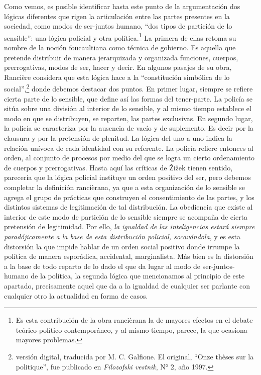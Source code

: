 Como vemos, es posible identificar hasta este punto de la argumentación dos lógicas diferentes que rigen la articulación entre las partes presentes en la sociedad, como modos de ser-juntos humano, \enquote{dos tipos de partición de lo sensible}: una lógica policial y otra política.\footnote{Es esta contribución de la obra rancièrana la de mayores efectos en el debate teórico-político contemporáneo, y al mismo tiempo, parece, la que ocasiona mayores problemas.} La primera de ellas retoma su nombre de la noción foucaultiana como técnica de gobierno. Es aquella que pretende distribuir de manera jerarquizada y organizada funciones, cuerpos, prerrogativas, modos de ser, hacer y decir. En algunos pasajes de su obra, Rancière considera que esta lógica hace a la \enquote{constitución simbólica de lo social},\footnote{\cite[][5]{@7080-RANCIERE1997} versión digital, traducida por M. C. Galfione. El original, \enquote{Onze thèses sur la politique}, fue publicado en \emph{Filozofski vestnik}, N° 2, año 1997.} donde debemos destacar dos puntos. En primer lugar, siempre se refiere cierta parte de lo sensible, que define así las formas del tener-parte. La policía se sitúa sobre una división al interior de lo sensible, y al mismo tiempo establece el modo en que se distribuyen, se reparten, las partes exclusivas. En segundo lugar, la policía se caracteriza por la ausencia de vacío y de suplemento. Es decir por la clausura y por la pretensión de plenitud. La lógica del uno a uno indica la relación unívoca de cada identidad con su referente. La policía refiere entonces al orden, al conjunto de procesos por medio del que se logra un cierto ordenamiento de cuerpos y prerrogativas. Hasta aquí las críticas de Žižek tienen sentido, parecería que la lógica policial instituye un orden positivo del ser, pero debemos completar la definición rancièrana, ya que a esta organización de lo sensible se agrega el grupo de prácticas que construyen el consentimiento de las partes, y los distintos sistemas de legitimación de tal distribución. La obediencia que existe al interior de este modo de partición de lo sensible siempre se acompaña de cierta pretensión de legitimidad. Por ello, \emph{la igualdad de las inteligencias estará siempre paradójicamente a la base de esta distribución policial, socavándola}, y es esta distorsión la que impide hablar de un orden social positivo donde irrumpe la política de manera esporádica, accidental, marginalista. Más bien es la distorsión a la base de todo reparto de lo dado el que da lugar al modo de ser-juntos-humano de la política, la segunda lógica que mencionamos al principio de este apartado, precisamente aquel que da a la igualdad de cualquier ser parlante con cualquier otro la actualidad en forma de casos.

